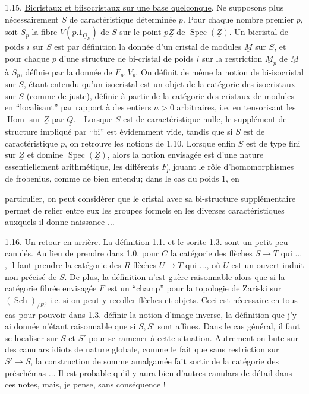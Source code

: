 1.15. \uline{Bicristaux et biisocristaux sur une base quelconque}. Ne supposons plus nécessairement $S$ de caractéristique déterminée $p$.  Pour chaque nombre premier $p$, soit $S_p$ la fibre $V(p.1_{\underline{O}_S})$ de $S$ sur le point $p\underline{Z}$ de $\operatorname{Spec}(\underline{Z})$. Un bicristal de poids $i$ sur $S$ est par définition la donnée d'un cristal de modules $\underline{M}$ sur $S$, et pour chaque $p$ d'une structure de bi-cristal de poids $i$ sur la restriction $\underline{M}_p$ de $\underline{M}$ à $S_p$, définie par la donnée de $F_p,V_p$. On définit de même la notion de bi-isocristal sur $S$, étant entendu qu'un isocristal est un objet de la catégorie des isocristaux sur $S$ (comme de juste), définie à partir de la catégorie des cristaux de modules en ``localisant'' par rapport à des entiers $n>0$ arbitraires, i.e. en tensorisant les $\operatorname{Hom}$ sur $\underline{Z}$ par $\underline{Q}$. - Lorsque $S$ est de caractéristique nulle, le supplément de structure impliqué par ``bi'' est évidemment vide, tandis que si $S$ est de caractéristique $p$, on retrouve les notions de 1.10. Lorsque enfin $S$ est de type fini sur $\underline{Z}$ et domine $\operatorname{Spec}(\underline{Z})$, alors la notion envisagée est d'une nature essentiellement arithmétique, les différents $F_p$ jouant le rôle d'homomorphismes de frobenius, comme de bien entendu; dans le cas du poids 1, en


particulier, on peut considérer que le cristal avec sa bi-structure supplémentaire permet de relier entre eux les groupes formels en les diverses caractéristiques auxquels il donne naissance $\ldots$

1.16. \uline{Un retour en arrière}. La définition 1.1. et le sorite 1.3. sont un petit peu canulés. Au lieu de prendre dans 1.0. pour $C$ la catégorie des flèches $S\longrightarrow T$ qui $\ldots$, il faut prendre la catégorie des $R$-flèches $U\longrightarrow T$ qui $\ldots$, où $U$ est un ouvert induit non précisé de $S$. De plus,  la définition n'est guère raisonnable alors que si la catégorie fibrée envisagée $\underline{F}$ est un ``champ'' pour la topologie de Zariski sur $(\operatorname{Sch})_{/R}$, i.e. si on peut y recoller flèches et objets. Ceci est nécessaire en tous cas pour pouvoir dans 1.3. définir la notion d'image inverse, la définition que j'y ai donnée n'étant raisonnable que si $S,S'$ sont affines. Dans le cas général, il faut se localiser sur $S$ et $S'$ pour se ramener à cette situation. Autrement on bute sur des canulars idiots de nature globale, comme le fait que sans restriction sur $S'\to S$, la construction   de somme amalgamée fait sortir de la catégorie des préschémas $\ldots$ Il est probable qu'il y aura bien d'autres canulars de détail dans ces notes, mais, je pense, sans conséquence !

